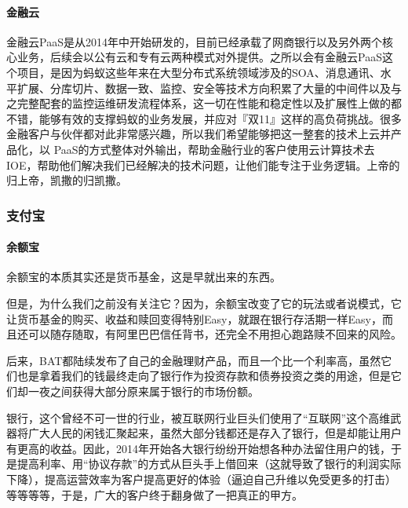 \documentclass[letterpaper,11pt,english]{sphinxmanual}
\begin{document}
\paragraph{金融云}
\label{\detokenize{chapter_company/antgroup:id4}}
金融云PaaS是从2014年中开始研发的，目前已经承载了网商银行以及另外两个核心业务，后续会以公有云和专有云两种模式对外提供。之所以会有金融云PaaS这个项目，是因为蚂蚁这些年来在大型分布式系统领域涉及的SOA、消息通讯、水平扩展、分库切片、数据一致、监控、安全等技术方向积累了大量的中间件以及与之完整配套的监控运维研发流程体系，这一切在性能和稳定性以及扩展性上做的都不错，能够有效的支撑蚂蚁的业务发展，并应对『双11』这样的高负荷挑战。很多金融客户与伙伴都对此非常感兴趣，所以我们希望能够把这一整套的技术上云并产品化，以
PaaS的方式整体对外输出，帮助金融行业的客户使用云计算技术去IOE，帮助他们解决我们已经解决的技术问题，让他们能专注于业务逻辑。上帝的归上帝，凯撒的归凯撒。%
\begin{footnote}[875]\sphinxAtStartFootnote
{}
%
\end{footnote}


\subsubsection{支付宝}
\label{\detokenize{chapter_company/alipay:id1}}\label{\detokenize{chapter_company/alipay::doc}}

\paragraph{余额宝}
\label{\detokenize{chapter_company/alipay:id2}}
余额宝的本质其实还是货币基金，这是早就出来的东西。

但是，为什么我们之前没有关注它？因为，余额宝改变了它的玩法或者说模式，它让货币基金的购买、收益和赎回变得特别Easy，就跟在银行存活期一样Easy，而且还可以随存随取，有阿里巴巴信任背书，还完全不用担心跑路赎不回来的风险。

后来，BAT都陆续发布了自己的金融理财产品，而且一个比一个利率高，虽然它们也是拿着我们的钱最终走向了银行作为投资存款和债券投资之类的用途，但是它们却一夜之间获得大部分原来属于银行的市场份额。

银行，这个曾经不可一世的行业，被互联网行业巨头们使用了“互联网”这个高维武器将广大人民的闲钱汇聚起来，虽然大部分钱都还是存入了银行，但是却能让用户有更高的收益。因此，2014年开始各大银行纷纷开始想各种办法留住用户的钱，于是提高利率、用“协议存款”的方式从巨头手上借回来（这就导致了银行的利润实际下降），提高运营效率为客户提高更好的体验（逼迫自己升维以免受更多的打击）等等等等，于是，广大的客户终于翻身做了一把真正的甲方。
\end{document}
